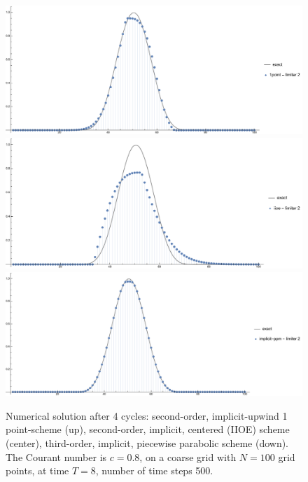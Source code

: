 \documentclass[../thesis.tex]{subfiles}
\begin{document}
\begin{figure}[H]
	\centering
	\includegraphics[width=\textwidth]{fig-1point-c0p8-T8-limit2-smooth.pdf}
	\includegraphics[width=\textwidth]{fig-iioe-c0p8-T8-limit2-smooth.pdf}
	\includegraphics[width=\textwidth]{fig-implicit-ppm-c0p8-T8-limit2-smooth.pdf}
	\caption{Numerical solution after 4 cycles: second-order, implicit-upwind 1 point-scheme (up), second-order, implicit, centered (IIOE) scheme (center), third-order, implicit, piecewise parabolic scheme (down). The Courant number is \(c = 0.8\), on a coarse grid with \(N = 100\) grid points, at time \(T = 8\), number of time steps 500.}
	\label{fig:c0p8-T8-limit2-smooth}
\end{figure}
\end{document}
